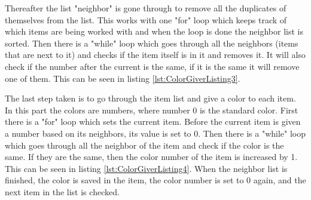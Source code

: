 Thereafter the list "neighbor" is gone through to remove all the duplicates of themselves from the list. This works with one "for" loop which keeps track of which items are being worked with and when the loop is done the neighbor list is sorted. Then there is a "while" loop which goes through all the neighbors (items that are next to it) and checks if the item itself is in it and removes it. It will also check if the number after the current is the same, if it is the same it will remove one of them. This can be seen in listing \ref{lst:ColorGiverListing3}.

The last step taken is to go through the item list and give a color to each item. In this part the colors are numbers, where number 0 is the standard color. First there is a "for" loop which sets the current item. Before the current item is given a number based on its neighbors, its value is set to 0. Then there is a "while" loop which goes through all the neighbor of the item and check if the color is the same. If they are the same, then the color number of the item is increased by 1. This can be seen in listing \ref{lst:ColorGiverListing4}. When the neighbor list is finished, the color is saved in the item, the color number is set to 0 again, and the next item in the list is checked.
